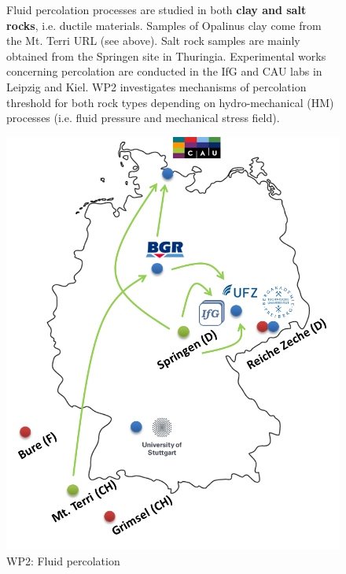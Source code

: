 \begin{figure}[h!]
\begin{minipage}{0.48\textwidth}
Fluid percolation processes are studied in both \textbf{clay and salt rocks}, i.e. ductile materials. Samples of Opalinus clay come from the Mt. Terri URL (see above). Salt rock samples are mainly obtained from the Springen site in Thuringia. Experimental works concerning percolation are conducted in the IfG and CAU labs in Leipzig and Kiel. WP2 investigates mechanisms of percolation threshold for both rock types depending on hydro-mechanical (HM) processes (i.e. fluid pressure and mechanical stress field).
\end{minipage}
\hfill
\begin{minipage}{0.48\textwidth}
\includegraphics[width=\textwidth]{figures/geomint-wp2.png}
\caption{WP2: Fluid percolation}
\end{minipage}
\end{figure}

